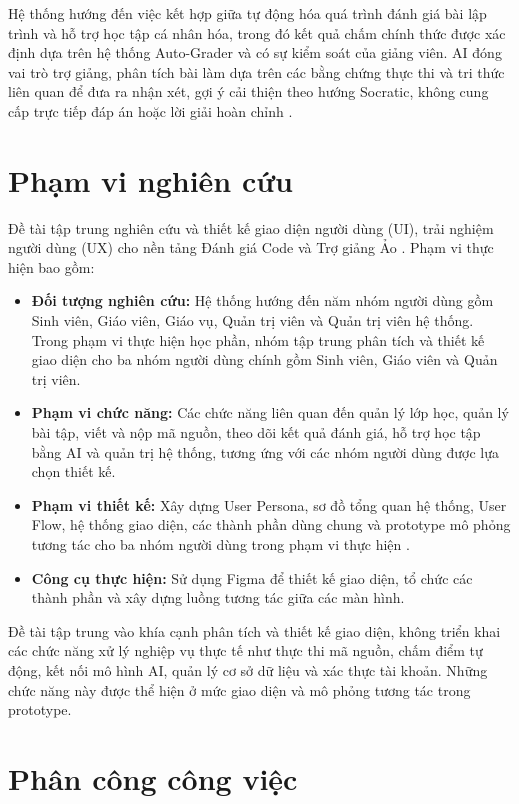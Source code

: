 \documentclass[12pt,a4paper,oneside]{report}
\begin{document}
Hệ thống hướng đến việc kết hợp giữa tự động hóa quá trình đánh giá bài lập trình và hỗ trợ học tập cá nhân hóa, trong đó kết quả chấm chính thức được xác định dựa trên hệ thống Auto-Grader và có sự kiểm soát của giảng viên. AI đóng vai trò trợ giảng, phân tích bài làm dựa trên các bằng chứng thực thi và tri thức liên quan để đưa ra nhận xét, gợi ý cải thiện theo hướng Socratic, không cung cấp trực tiếp đáp án hoặc lời giải hoàn chỉnh \cite{combefis2022automated, messer2024automated}.

\section{Phạm vi nghiên cứu}

Đề tài tập trung nghiên cứu và thiết kế giao diện người dùng (UI), trải nghiệm người dùng (UX) cho nền tảng Đánh giá Code và Trợ giảng Ảo \cite{iso9241}. Phạm vi thực hiện bao gồm:
\begin{itemize}
  \item \textbf{Đối tượng nghiên cứu:} Hệ thống hướng đến năm nhóm người dùng gồm Sinh viên, Giáo viên, Giáo vụ, Quản trị viên và Quản trị viên hệ thống. Trong phạm vi thực hiện học phần, nhóm tập trung phân tích và thiết kế giao diện cho ba nhóm người dùng chính gồm Sinh viên, Giáo viên và Quản trị viên.
  \item \textbf{Phạm vi chức năng:} Các chức năng liên quan đến quản lý lớp học, quản lý bài tập, viết và nộp mã nguồn, theo dõi kết quả đánh giá, hỗ trợ học tập bằng AI và quản trị hệ thống, tương ứng với các nhóm người dùng được lựa chọn thiết kế.
  \item \textbf{Phạm vi thiết kế:} Xây dựng User Persona, sơ đồ tổng quan hệ thống, User Flow, hệ thống giao diện, các thành phần dùng chung và prototype mô phỏng tương tác cho ba nhóm người dùng trong phạm vi thực hiện \cite{iso9241, nielsen1994}.
  \item \textbf{Công cụ thực hiện:} Sử dụng Figma để thiết kế giao diện, tổ chức các thành phần và xây dựng luồng tương tác giữa các màn hình.
\end{itemize}

Đề tài tập trung vào khía cạnh phân tích và thiết kế giao diện, không triển khai các chức năng xử lý nghiệp vụ thực tế như thực thi mã nguồn, chấm điểm tự động, kết nối mô hình AI, quản lý cơ sở dữ liệu và xác thực tài khoản. Những chức năng này được thể hiện ở mức giao diện và mô phỏng tương tác trong prototype.

\section{Phân công công việc}
\end{document}
